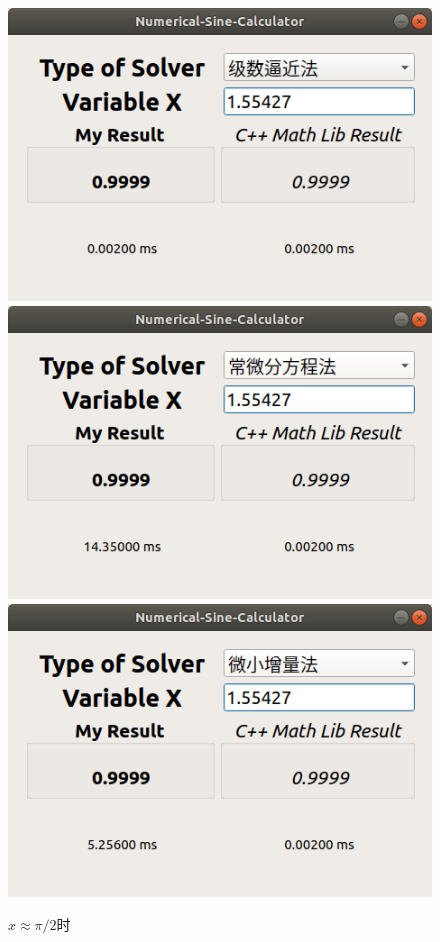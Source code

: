\documentclass[UTF8]{ctexart}
\begin{document}
\begin{figure}[H]
    \centering
    \includegraphics[scale=0.25]{images/serieshalfpi.png}
    \includegraphics[scale=0.25]{images/diffhalfpi.png}
    \includegraphics[scale=0.25]{images/deltahalfpi.png}
    \caption{$x \approx \pi/2 $时}
\end{figure}
\end{document}
